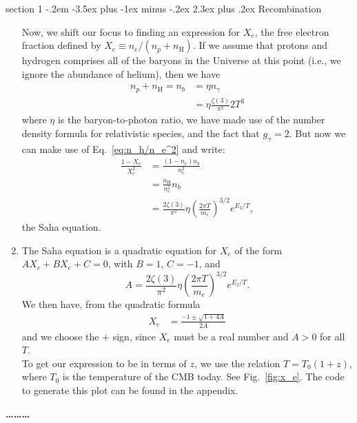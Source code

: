 \documentclass[12pt]{article}
\makeatletter
\newenvironment{problem}{\@startsection
	{section}
	{1}
	{-.2em}
	{-3.5ex plus -1ex minus -.2ex}
	{2.3ex plus .2ex}
	{\pagebreak[3]%
		\large\bf\noindent{Problem }
	}
}
{%
	\begin{center}\large\bf \ldots\ldots\ldots\end{center}}
\makeatother
\begin{document}
\begin{problem}{Recombination}
\begin{enumerate}
			Now, we shift our focus to finding an expression for $X_e$, the free electron fraction defined by $X_e \equiv n_e/(n_p + n_\mathrm{H})$.  If we assume that protons and hydrogen comprises all of the baryons in the Universe at this point (i.e., we ignore the abundance of helium), then we have \begin{align*}
				n_p + n_\mathrm{H} = n_b &= \eta n_\gamma
				\\
				&= \eta \frac{\zeta(3)}{\pi^2}2 T^3
			\end{align*} where $\eta$ is the baryon-to-photon ratio, we have made use of the number density formula for relativistic species, and the fact that $g_\gamma = 2$.  But now we can make use of Eq.~\ref{eq:n_h/n_e^2} and write: \begin{align*}
				\frac{1 - X_e}{X_e^2} &= \frac{(1 - n_e) n_b}{n_e^2}
				\\
				&= \frac{n_\mathrm{H}}{n_e^2}n_b
				\\
				&=\frac{2\zeta(3)}{\pi^2} \eta  \left(  \frac{ 2\pi T}{m_e}\right)^{3/2} e^{E_I/T},
			\end{align*} the Saha equation.
			
			\item The Saha equation is a quadratic equation for $X_e$ of the form $AX_e + BX_e + C = 0$, with $B = 1$, $C=-1$, and \begin{equation*}
				A= \frac{2\zeta(3)}{\pi^2} \eta  \left(  \frac{ 2\pi T}{m_e}\right)^{3/2} e^{E_I/T}.
			\end{equation*} We then have, from the quadratic formula \begin{align*}
				X_e &= \frac{-1 \pm \sqrt{1 + 4A}}{2A}
			\end{align*} and we choose the $+$ sign, since $X_e$ must be a real number and $A > 0$ for all $T$.\\
			
			To get our expression to be in terms of $z$, we use the relation $T = T_0 (1+z)$, where $T_0$ is the temperature of the CMB today.  See Fig.~\ref*{fig:x_e}.  The code to generate this plot can be found in the appendix.
			

\end{enumerate}
\end{problem}
\end{document}

